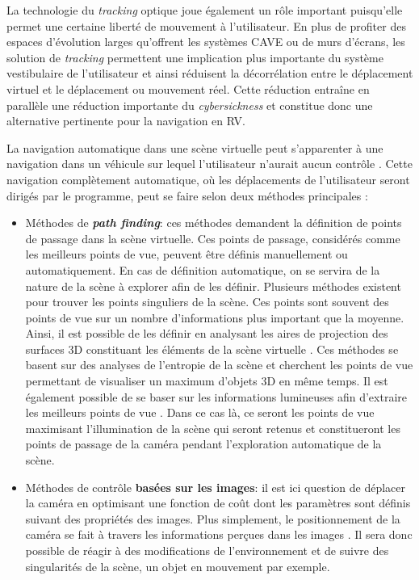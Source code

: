 La technologie du \textit{tracking} optique joue également un rôle important puisqu'elle permet une certaine liberté de mouvement à l'utilisateur. En plus de profiter des espaces d'évolution larges qu'offrent les systèmes CAVE ou de murs d'écrans, les solution de \textit{tracking} permettent une implication plus importante du système vestibulaire de l'utilisateur et ainsi réduisent la décorrélation entre le déplacement virtuel et le déplacement ou mouvement réel. Cette réduction entraîne en parallèle une réduction importante du \textit{cybersickness} et constitue donc une alternative pertinente pour la navigation en RV.



La navigation automatique dans une scène virtuelle peut s'apparenter à une navigation dans un véhicule sur lequel l'utilisateur n'aurait aucun contrôle \cite{habibi20143d}. Cette navigation complètement automatique, où les déplacements de l'utilisateur seront dirigés par le programme, peut se faire selon deux méthodes principales :

\begin{itemize}
  \item Méthodes de \textit{\textbf{path finding}}: ces méthodes demandent la définition de points de passage dans la scène virtuelle. Ces points de passage, considérés comme les meilleurs points de vue, peuvent être définis manuellement ou automatiquement. En cas de définition automatique, on se servira de la nature de la scène à explorer afin de les définir. Plusieurs méthodes existent pour trouver les points singuliers de la scène. Ces points sont souvent des points de vue sur un nombre d'informations plus important que la moyenne. Ainsi, il est possible de les définir en analysant les aires de projection des surfaces 3D constituant les éléments de la scène virtuelle \cite{vazquez2001viewpoint}. Ces méthodes se basent sur des analyses de l'entropie de la scène et cherchent les points de vue permettant de visualiser un maximum d'objets 3D en même temps. Il est également possible de se baser sur les informations lumineuses afin d'extraire les meilleurs points de vue \cite{gumhold2002maximum}. Dans ce cas là, ce seront les points de vue maximisant l'illumination de la scène qui seront retenus et constitueront les points de passage de la caméra pendant l'exploration automatique de la scène.
  \item Méthodes de contrôle \textbf{basées sur les images}: il est ici question de déplacer la caméra en optimisant une fonction de coût dont les paramètres sont définis suivant des propriétés des images. Plus simplement, le positionnement de la caméra se fait à travers les informations perçues dans les images \cite{courty2001computer}. Il sera donc possible de réagir à des modifications de l'environnement et de suivre des singularités de la scène, un objet en mouvement par exemple. 
\end{itemize}

